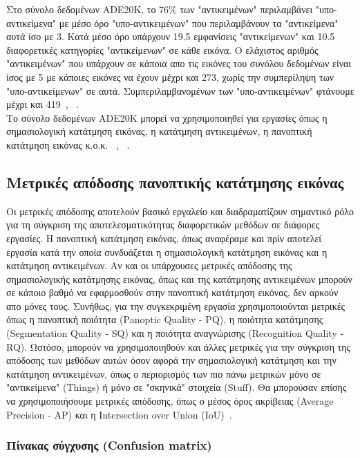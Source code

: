 \documentclass[12pt]{article}
\numberwithin{equation}{section}
\begin{document}
Στο σύνολο δεδομένων ADE20K, το 76\% των "αντικειμένων" περιλαμβάνει "υπο-αντικείμενα" με μέσο όρο "υπο-αντικειμένων" που περιλαμβάνουν τα "αντικείμενα" αυτά ίσο με 3. Κατά μέσο όρο υπάρχουν 19.5 εμφανίσεις "αντικείμενων" και 10.5 διαφορετικές κατηγορίες "αντικείμενων" σε κάθε εικόνα. Ο ελάχιστος αριθμός "αντικειμένων" που υπάρχουν σε κάποια απο τις εικόνες του συνόλου δεδομένων είναι ίσος με 5 με κάποιες εικόνες να έχουν μέχρι και 273, χωρίς την συμπερίληψη των "υπο-αντικείμενων" σε αυτά. Συμπεριλαμβανομένων των "υπο-αντικειμένων" φτάνουμε μέχρι και 419~\cite{8100027}, ~\cite{zhou2018semanticunderstandingscenesade20k}. \\

Το σύνολο δεδομένων ADE20K μπορεί να χρησιμοποιηθεί για εργασίες όπως η σημασιολογική κατάτμηση εικόνας, η κατάτμηση αντικειμένων, η πανοπτική κατάτμηση εικόνας κ.ο.κ. ~\cite{8100027}, ~\cite{cheng2022maskedattentionmasktransformeruniversal}.


\subsection{Μετρικές απόδοσης πανοπτικής κατάτμησης εικόνας}

Οι μετρικές απόδοσης αποτελούν βασικό εργαλείο και διαδραματίζουν σημαντικό ρόλο για τη σύγκριση της αποτελεσματικότητας διαφορετικών μεθόδων σε διάφορες εργασίες. Η πανοπτική κατάτμηση εικόνας, όπως αναφέραμε και πρίν αποτελεί εργασία κατά την οποία συνδυάζεται η σημασιολογική κατάτμηση εικόνας και η κατάτμηση αντικειμένων. Αν και οι υπάρχουσες μετρικές απόδοσης της σημασιολογικής κατάτμησης εικόνας, όπως και της κατάτμησης αντικειμένων μπορούν σε κάποιο βαθμό να εφαρμοσθούν στην πανοπτική κατάτμηση εικόνας, δεν αρκούν απο μόνες τους. Συνήθως, για την συγκεκριμένη εργασία χρησιμοποιούνται μετρικές όπως η πανοπτική ποιότητα (Panoptic Quality - PQ), η ποιότητα κατάτμησης (Segmentation Quality - SQ) και η ποιότητα αναγνώρισης (Recognition Quality - RQ). Ωστόσο, μπορούν να χρησιμοποιηθούν και άλλες μετρικές για την σύγκριση της απόδοσης των μεθόδων αυτών όσον αφορά την σημασιολογική κατάτμηση και την κατάτμηση αντικειμένων, όπως ο περιορισμός των πιο πάνω μετρικών μόνο σε "αντικείμενα" (Things) ή μόνο σε "σκηνικά" στοιχεία (Stuff). Θα μπορούσαν επίσης να χρησιμοποιήσουμε μετρικές απόδοσης, όπως ο μέσος όρος ακρίβειας (Average Precision - AP) και η Intersection over Union (IoU)~\cite{elharrouss2021panopticsegmentationreview}. 

\subsubsection{Πίνακας σύγχυσης (Confusion matrix)}
\end{document}
